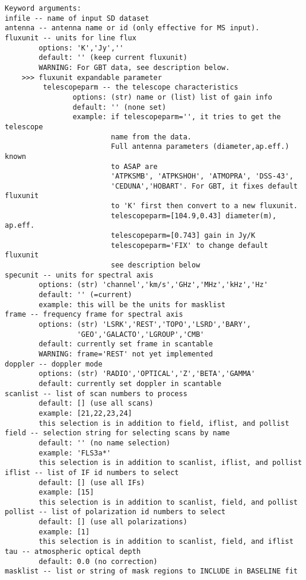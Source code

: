 \begin{verbatim}
Keyword arguments:
infile -- name of input SD dataset
antenna -- antenna name or id (only effective for MS input). 
fluxunit -- units for line flux
        options: 'K','Jy',''
        default: '' (keep current fluxunit)
        WARNING: For GBT data, see description below.
    >>> fluxunit expandable parameter
         telescopeparm -- the telescope characteristics
                options: (str) name or (list) list of gain info
                default: '' (none set)
                example: if telescopeparm='', it tries to get the telescope
                         name from the data.
                         Full antenna parameters (diameter,ap.eff.) known
                         to ASAP are
                         'ATPKSMB', 'ATPKSHOH', 'ATMOPRA', 'DSS-43',
                         'CEDUNA','HOBART'. For GBT, it fixes default fluxunit
                         to 'K' first then convert to a new fluxunit.
                         telescopeparm=[104.9,0.43] diameter(m), ap.eff.
                         telescopeparm=[0.743] gain in Jy/K
                         telescopeparm='FIX' to change default fluxunit
                         see description below
specunit -- units for spectral axis
        options: (str) 'channel','km/s','GHz','MHz','kHz','Hz'
        default: '' (=current)
        example: this will be the units for masklist
frame -- frequency frame for spectral axis
        options: (str) 'LSRK','REST','TOPO','LSRD','BARY',
                 'GEO','GALACTO','LGROUP','CMB'
        default: currently set frame in scantable
        WARNING: frame='REST' not yet implemented
doppler -- doppler mode
        options: (str) 'RADIO','OPTICAL','Z','BETA','GAMMA'
        default: currently set doppler in scantable
scanlist -- list of scan numbers to process
        default: [] (use all scans)
        example: [21,22,23,24]
        this selection is in addition to field, iflist, and pollist
field -- selection string for selecting scans by name
        default: '' (no name selection)
        example: 'FLS3a*'
        this selection is in addition to scanlist, iflist, and pollist
iflist -- list of IF id numbers to select
        default: [] (use all IFs)
        example: [15]
        this selection is in addition to scanlist, field, and pollist
pollist -- list of polarization id numbers to select
        default: [] (use all polarizations)
        example: [1]
        this selection is in addition to scanlist, field, and iflist
tau -- atmospheric optical depth
        default: 0.0 (no correction)
masklist -- list or string of mask regions to INCLUDE in BASELINE fit

\end{verbatim}

